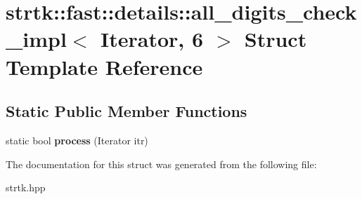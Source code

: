 \hypertarget{structstrtk_1_1fast_1_1details_1_1all__digits__check__impl_3_01Iterator_00_016_01_4}{\section{strtk\-:\-:fast\-:\-:details\-:\-:all\-\_\-digits\-\_\-check\-\_\-impl$<$ Iterator, 6 $>$ Struct Template Reference}
\label{structstrtk_1_1fast_1_1details_1_1all__digits__check__impl_3_01Iterator_00_016_01_4}
}
\subsection*{Static Public Member Functions}
\begin{DoxyCompactItemize}
\item 
\hypertarget{structstrtk_1_1fast_1_1details_1_1all__digits__check__impl_3_01Iterator_00_016_01_4_a9131297cfbb502befa4a7a880899b55b}{static bool {\bfseries process} (Iterator itr)}\label{structstrtk_1_1fast_1_1details_1_1all__digits__check__impl_3_01Iterator_00_016_01_4_a9131297cfbb502befa4a7a880899b55b}

\end{DoxyCompactItemize}


The documentation for this struct was generated from the following file\-:\begin{DoxyCompactItemize}
\item 
strtk.\-hpp\end{DoxyCompactItemize}
